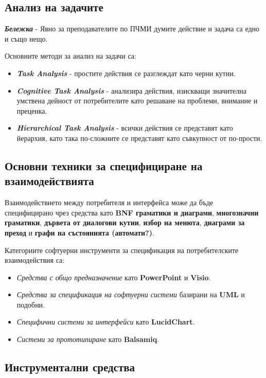 \documentclass[fleqn,12pt]{article}
\begin{document}
\subsection{Анализ на задачите}

\textbf{\textit{Бележка}} - Явно за преподавателите по ПЧМИ думите действие и задача са едно и също нещо.

Основните методи за анализ на задачи са:
\begin{itemize}
    \item \textbf{\textit{Task Analysis}} - простите действия се разглеждат като черни кутии.
    \item \textbf{\textit{Cognitive Task Analysis}} - анализира действия, изискващи значителна умствена дейност от потребителите като решаване на проблеми, внимание и преценка.
    \item \textbf{\textit{Hierarchical Task Analysis}} - всички действия се представят като йерархия, като така по-сложните се представят като съвкупност от по-прости.
\end{itemize}

\subsection{Основни техники за специфициране на взаимодействията}

Взаимодействието между потребителя и интерфейса може да бъде специфицирано чрез средства като \textbf{BNF граматики и диаграми}, \textbf{многозначни граматики}, \textbf{дървета от диалогови кутии}, \textbf{избор на менюта}, \textbf{диаграми за преход} и \textbf{графи на състоянията (автомати?)}.

Категориите софтуерни инструменти за спецификация на потребителските взаимодействия са:
\begin{itemize}
    \item \textit{Средства с общо предназначение} като \textbf{PowerPoint} и \textbf{Visio}.
    \item \textit{Средства за спецификация на софтуерни системи} базирани на \textbf{UML} и подобни.
    \item \textit{Специфични системи за интерфейси} като \textbf{LucidChart}.
    \item \textit{Системи за прототипиране} като \textbf{Balsamiq}.
\end{itemize}

\subsection{Инструментални средства}
\end{document}
